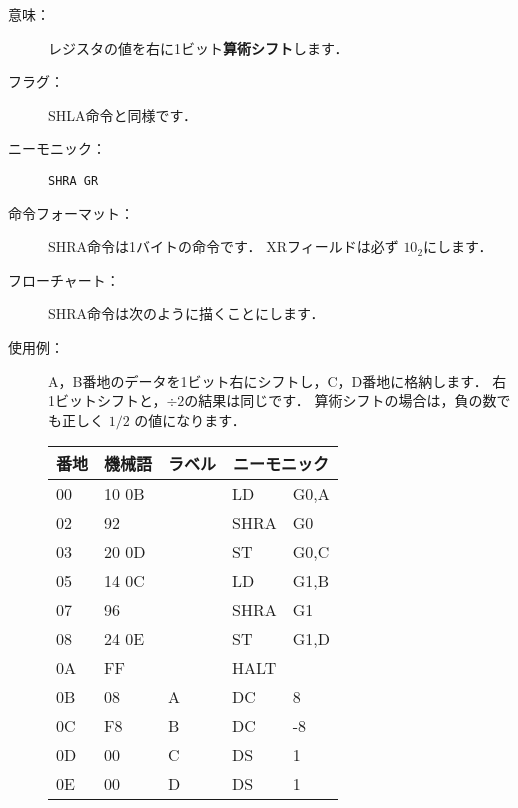 \begin{center}
\end{center}

\begin{description}
\item[意味：]レジスタの値を右に1ビット{\bf 算術シフト}します．

\item[フラグ：]
SHLA命令と同様です．

\item[ニーモニック：]{\tt SHRA  GR}

\item[命令フォーマット：]SHRA命令は1バイトの命令です．
XRフィールドは必ず $10_2$にします．


\item[フローチャート：]SHRA命令は次のように描くことにします．

\begin{center}
\end{center}

\item[使用例：]
A，B番地のデータを1ビット右にシフトし，C，D番地に格納します．
右1ビットシフトと，$\div 2$の結果は同じです．
算術シフトの場合は，負の数でも正しく $1/2$ の値になります．

{\tt\begin{center}
\begin{tabular}{|l|l|l|l l|} \hline
番地 & 機械語 & ラベル & \multicolumn{2}{|c|}{ニーモニック} \\
\hline
00 & 10 0B &   & LD   & G0,A \\
02 & 92    &   & SHRA & G0   \\
03 & 20 0D &   & ST   & G0,C \\
05 & 14 0C &   & LD   & G1,B \\
07 & 96    &   & SHRA & G1   \\
08 & 24 0E &   & ST   & G1,D \\
0A & FF    &   & HALT &      \\
0B & 08    & A & DC   & 8    \\
0C & F8    & B & DC   & -8   \\
0D & 00    & C & DS   & 1    \\
0E & 00    & D & DS   & 1    \\
\hline
\end{tabular}
\end{center}}
\end{description}

